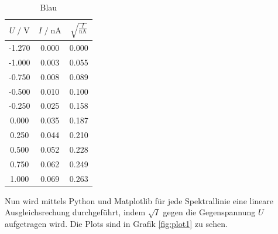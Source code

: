 \begin{table}
    \centering
    \caption{Blau}
    \label{tab:blau}
    \begin{tabular}{c c c}
    \toprule
    $ U \;/\; \si{\volt} $ & $I \;/\; \si{\nano\ampere}$ &
    $ \sqrt{\frac{I}{\si{\nano\ampere}}}$\\
    \midrule 
      -1.270 & 0.000 & 0.000\\
      -1.000 & 0.003 & 0.055\\
      -0.750 & 0.008 & 0.089\\
      -0.500 & 0.010 & 0.100\\
      -0.250 & 0.025 & 0.158\\
       0.000 & 0.035 & 0.187\\
       0.250 & 0.044 & 0.210\\
       0.500 & 0.052 & 0.228\\
       0.750 & 0.062 & 0.249\\
       1.000 & 0.069 & 0.263\\ 
    \bottomrule
    \end{tabular}
\end{table}


Nun wird mittels Python und Matplotlib für jede Spektrallinie eine lineare Ausgleichsrechung durchgeführt, indem 
$\sqrt{I}$ gegen die Gegenspannung $U$ aufgetragen wird. Die Plots sind in Grafik \ref{fig:plot1} zu sehen.

